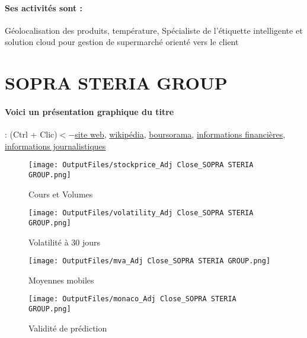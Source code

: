 \documentclass[11pt,a4paper]{report}%
\begin{document}
\paragraph{Ses activités sont : } Géolocalisation des produits, température, Spécialiste de l’étiquette intelligente et solution cloud pour gestion de supermarché orienté vers le client 
    
    \newpage

\section{SOPRA STERIA GROUP}

\paragraph{Voici un présentation graphique du titre} : (Ctrl + Clic)$<-$\href{https://www.soprasteria.com/fr}{site web}, \href{https://fr.wikipedia.org/wiki/Sopra_Steria}{wikipédia}, \href{https://www.boursorama.com/cours/1rPSOP}{boursorama}, \href{https://www.qwant.com/?q=site:https:%2f%2fwww.easybourse.com%2faction-societe%2fSOPRA-STERIA-GROUP&t=web&client=ext-firefox-hp}{informations financières}, \href{https://bourse.lerevenu.com/cours-de-bourse/fiche-valeur-synthese/SOPRA-STERIA-GROUP/SOP-FR}{informations journalistiques}
\begin{figure}[!htb]
   \begin{minipage}{0.5\textwidth}
     \centering
     \texttt{[image: OutputFiles/stockprice\_Adj Close\_SOPRA STERIA GROUP.png]}
     \caption{Cours et Volumes}\label{Fig:price_SOPRA STERIA GROUP}
   \end{minipage}\hfill
   \begin{minipage}{0.5\textwidth}
     \centering
     \texttt{[image: OutputFiles/volatility\_Adj Close\_SOPRA STERIA GROUP.png]}
     \caption{Volatilité à 30 jours}\label{Fig:volat_SOPRA STERIA GROUP}
   \end{minipage}
\end{figure}
\begin{figure}[!htb]
   \begin{minipage}{0.5\textwidth}
     \centering
     \texttt{[image: OutputFiles/mva\_Adj Close\_SOPRA STERIA GROUP.png]}
     \caption{Moyennes mobiles}\label{Fig:mva_SOPRA STERIA GROUP}
   \end{minipage}\hfill
   \begin{minipage}{0.5\textwidth}
     \centering
     \texttt{[image: OutputFiles/monaco\_Adj Close\_SOPRA STERIA GROUP.png]}
     \caption{Validité de prédiction}\label{Fig:prediction_SOPRA STERIA GROUP}
   \end{minipage}
\end{figure}
\end{document}
